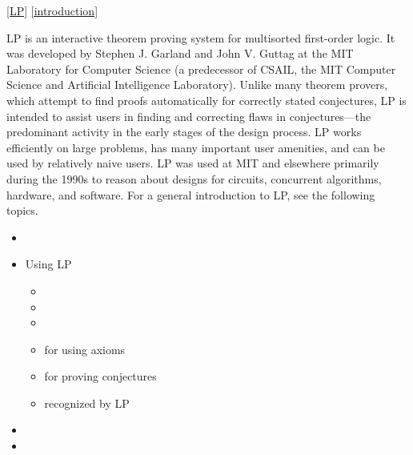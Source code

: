 \ref{LP}
\ref{introduction}

LP is an interactive theorem proving system for multisorted first-order logic.
It was developed by Stephen J. Garland and John V. Guttag at the MIT Laboratory
for Computer Science (a predecessor of CSAIL, the MIT Computer Science and
Artificial Intelligence Laboratory).
\p
Unlike many theorem provers, which attempt to find proofs automatically for
correctly stated conjectures, LP is intended to assist users in finding and
correcting flaws in conjectures---the predominant activity in the early stages
of the design process.  LP works efficiently on large problems, has many
important user amenities, and can be used by relatively naive users.
\p
LP was used at MIT and elsewhere primarily during the 1990s to reason about
designs for circuits, concurrent algorithms, hardware, and software.
\p
For a general introduction to LP, see the following topics.
\p
\begin{itemize}
\item {}
\item Using LP
\begin{itemize}
\item {}
\item {}
\item {}
\item {} for using axioms
\item {} for proving conjectures
\item {} recognized by LP
\end{itemize}
\item {}
\item {}
\end{itemize}
